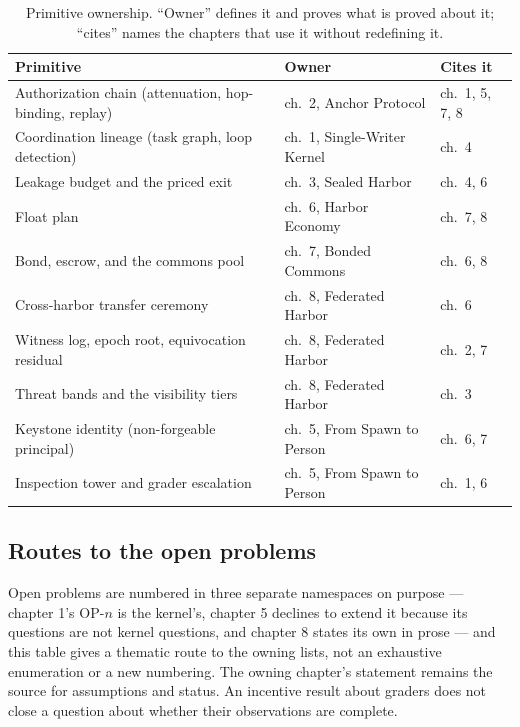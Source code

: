 \begin{table}[H]
\centering
\caption{Primitive ownership. ``Owner'' defines it and proves what is proved
about it; ``cites'' names the chapters that use it without redefining it.}
\label{tab:primitive-ownership}
\small
\begin{tabularx}{\textwidth}{@{}>{\raggedright\arraybackslash}X >{\raggedright\arraybackslash}p{} >{\raggedright\arraybackslash}p{}@{}}
\toprule
\textbf{Primitive} & \textbf{Owner} & \textbf{Cites it} \\
\midrule
Authorization chain (attenuation, hop-binding, replay) & ch.~2, Anchor Protocol & ch.~1, 5, 7, 8 \\
Coordination lineage (task graph, loop detection) & ch.~1, Single-Writer Kernel & ch.~4 \\
Leakage budget and the priced exit & ch.~3, Sealed Harbor & ch.~4, 6 \\
Float plan & ch.~6, Harbor Economy & ch.~7, 8 \\
Bond, escrow, and the commons pool & ch.~7, Bonded Commons & ch.~6, 8 \\
Cross-harbor transfer ceremony & ch.~8, Federated Harbor & ch.~6 \\
Witness log, epoch root, equivocation residual & ch.~8, Federated Harbor & ch.~2, 7 \\
Threat bands and the visibility tiers & ch.~8, Federated Harbor & ch.~3 \\
Keystone identity (non-forgeable principal) & ch.~5, From Spawn to Person & ch.~6, 7 \\
Inspection tower and grader escalation & ch.~5, From Spawn to Person & ch.~1, 6 \\
\bottomrule
\end{tabularx}
\end{table}

\subsection*{Routes to the open problems}
\label{app:open-concordance}

Open problems are numbered in three separate namespaces on purpose --- chapter
1's \textsf{OP-$n$} is the kernel's, chapter 5 declines to extend it because its
questions are not kernel questions, and chapter 8 states its own in prose --- and
this table gives a thematic route to the owning lists, not an exhaustive
enumeration or a new numbering. The owning chapter's statement remains the
source for assumptions and status. An incentive result about graders does not
close a question about whether their observations are complete.

